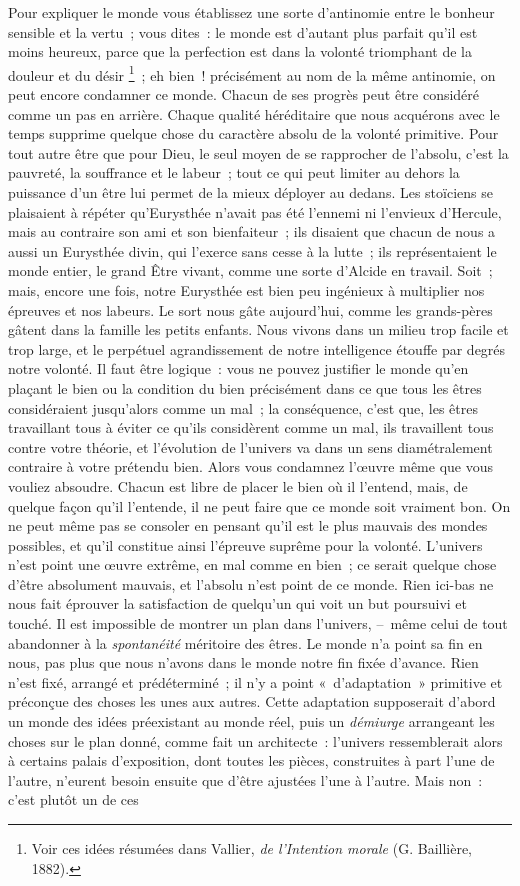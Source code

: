 \documentclass[french,twoside]{book} %
\begin{document}
Pour expliquer le monde vous établissez une sorte d’antinomie entre le bonheur sensible et la vertu ; vous dites : le monde est d’autant plus parfait qu’il est moins heureux, parce que la perfection est dans la volonté triomphant de la douleur et du désir \footnote{Voir ces idées résumées dans Vallier, \emph{de l’Intention morale} (G. Baillière, 1882).} ; eh bien ! précisément au nom de la même antinomie, on peut encore condamner ce monde. Chacun de ses progrès peut être considéré comme un pas en arrière. Chaque qualité héréditaire que nous acquérons avec le temps supprime quelque chose du caractère absolu de la volonté primitive. Pour tout autre être que pour Dieu, le seul moyen de se rapprocher de l’absolu, c’est la pauvreté, la souffrance et le labeur ; tout ce qui peut limiter au dehors la puissance d’un être lui permet de la mieux déployer au dedans. Les stoïciens se plaisaient à répéter qu’Eurysthée n’avait pas été l’ennemi ni l’envieux d’Hercule, mais au contraire son ami et son bienfaiteur ; ils disaient que chacun de nous a aussi un Eurysthée divin, qui l’exerce sans cesse à la lutte ; ils représentaient le monde entier, le grand Être vivant, comme une sorte d’Alcide en travail. Soit ; mais, encore une fois, notre Eurysthée est bien peu ingénieux à multiplier nos épreuves et nos labeurs. Le sort nous gâte aujourd’hui, comme les grands-pères gâtent dans la famille les petits enfants. Nous vivons dans un milieu trop facile et trop large, et le perpétuel agrandissement de notre intelligence étouffe par degrés notre volonté. Il faut être logique : vous ne pouvez justifier le monde qu’en plaçant le bien ou la condition du bien précisément dans ce que tous les êtres considéraient jusqu’alors comme un mal ; la conséquence, c’est que, les êtres travaillant tous à éviter ce qu’ils considèrent comme un mal, ils travaillent tous contre votre théorie, et l’évolution de l’univers va dans un sens diamétralement contraire à votre prétendu bien. Alors vous condamnez l’œuvre même que vous vouliez absoudre. Chacun est libre de placer le bien où il l’entend, mais, de quelque façon qu’il l’entende, il ne peut faire que ce monde soit vraiment bon. On ne peut même pas se consoler en pensant qu’il est le plus mauvais des mondes possibles, et qu’il constitue ainsi l’épreuve suprême pour la volonté. L’univers n’est point une œuvre extrême, en mal comme en bien ; ce serait quelque chose d’être absolument mauvais, et l’absolu n’est point de ce monde. Rien ici-bas ne nous fait éprouver la satisfaction de quelqu’un qui voit un but poursuivi et touché. Il est impossible de montrer un plan dans l’univers, – même celui de tout abandonner à la \emph{spontanéité} méritoire des êtres. Le monde n’a point sa fin en nous, pas plus que nous n’avons dans le monde notre fin fixée d’avance. Rien n’est fixé, arrangé et prédéterminé ; il n’y a point « d’adaptation » primitive et préconçue des choses les unes aux autres. Cette adaptation supposerait d’abord un monde des idées préexistant au monde réel, puis un \emph{démiurge} arrangeant les choses sur le plan donné, comme fait un architecte : l’univers ressemblerait alors à certains palais d’exposition, dont toutes les pièces, construites à part l’une de l’autre, n’eurent besoin ensuite que d’être ajustées l’une à l’autre. Mais non : c’est plutôt un de ces 
\end{document}

